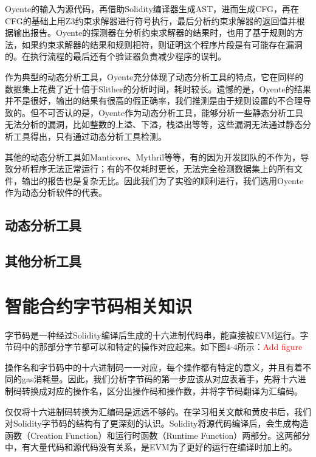 Oyente的输入为源代码，再借助Solidity编译器生成AST，进而生成CFG，再在CFG的基础上用Z3约束求解器进行符号执行，最后分析约束求解器的返回值并根据输出报告。Oyente的探测器在分析约束求解器的结果时，也用了基于规则的方法，如果约束求解器的结果和规则相符，则证明这个程序片段是有可能存在漏洞的。在执行流程的最后还有个验证器负责减少程序的误判。

作为典型的动态分析工具，Oyente充分体现了动态分析工具的特点，它在同样的数据集上花费了近十倍于Slither的分析时间，耗时较长。遗憾的是，Oyente的结果并不是很好，输出的结果有很高的假正确率，我们推测是由于规则设置的不合理导致的。但不可否认的是，Oyente作为动态分析工具，能够分析一些静态分析工具无法分析的漏洞，比如整数的上溢、下溢，栈溢出等等，这些漏洞无法通过静态分析工具得出，只有通过动态分析工具检测。

其他的动态分析工具如Manticore、Mythril等等，有的因为开发团队的不作为，导致分析程序无法正常运行；有的不仅耗时更长，无法完全检测数据集上的所有文件，输出的报告也是复杂无比。因此我们为了实验的顺利进行，我们选用Oyente作为动态分析软件的代表。

\subsection{动态分析工具}

\subsection{其他分析工具}


\section{智能合约字节码相关知识}

字节码是一种经过Solidity编译后生成的十六进制代码串，能直接被EVM运行。字节码中的那部分字节都可以和特定的操作对应起来。如下图4-4所示：\textcolor{red}{Add figure}

操作名和字节码中的十六进制码一一对应，每个操作都有特定的意义，并且有着不同的gas消耗量。因此，我们分析字节码的第一步应该从对应表着手，先将十六进制码转换成对应的操作名，区分出操作码和操作数，并将字节码翻译为汇编码。

仅仅将十六进制码转换为汇编码是远远不够的。在学习相关文献和黄皮书后，我们对Solidity字节码的结构有了更深刻的认识。Solidity将源代码编译后，会生成构造函数（Creation Function）和运行时函数（Runtime Function）两部分。这两部分中，有大量代码和源代码没有关系，是EVM为了更好的运行在编译时加上的。

